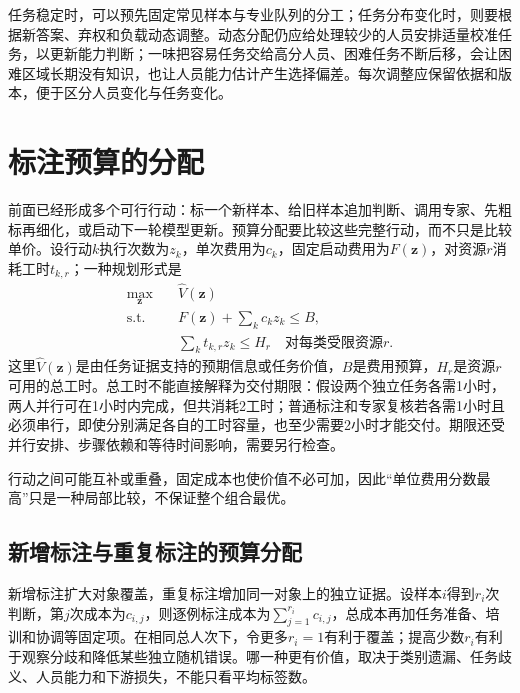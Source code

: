 任务稳定时，可以预先固定常见样本与专业队列的分工；任务分布变化时，则要根据新答案、弃权和负载动态调整。动态分配仍应给处理较少的人员安排适量校准任务，以更新能力判断；一味把容易任务交给高分人员、困难任务不断后移，会让困难区域长期没有知识，也让人员能力估计产生选择偏差。每次调整应保留依据和版本，便于区分人员变化与任务变化。

\section{标注预算的分配}
\label{sec:knowledge-acquisition-human-budget}

前面已经形成多个可行行动：标一个新样本、给旧样本追加判断、调用专家、先粗标再细化，或启动下一轮模型更新。预算分配要比较这些完整行动，而不只是比较单价。设行动$k$执行次数为$z_k$，单次费用为$c_k$，固定启动费用为$F(\bm{z})$，对资源$r$消耗工时$t_{k,r}$；一种规划形式是
\begin{equation}
  \begin{aligned}
    \max_{\bm{z}}\quad
      &\widehat V(\bm{z})\\
    \text{s.t.}\quad
      &F(\bm{z})+\sum_k c_k z_k\leq B,\\
      &\sum_k t_{k,r}z_k\leq H_r
      \quad\text{对每类受限资源$r$}.
  \end{aligned}
  \label{eq:knowledge-acquisition-human-budget-allocation}
\end{equation}
这里$\widehat V(\bm{z})$是由任务证据支持的预期信息或任务价值，$B$是费用预算，$H_r$是资源$r$可用的总工时。总工时不能直接解释为交付期限：假设两个独立任务各需1小时，两人并行可在1小时内完成，但共消耗2工时；普通标注和专家复核若各需1小时且必须串行，即使分别满足各自的工时容量，也至少需要2小时才能交付。期限还受并行安排、步骤依赖和等待时间影响，需要另行检查。

行动之间可能互补或重叠，固定成本也使价值不必可加，因此“单位费用分数最高”只是一种局部比较，不保证整个组合最优。

\subsection{新增标注与重复标注的预算分配}
\label{sec:knowledge-acquisition-human-new-versus-repeat}

新增标注扩大对象覆盖，重复标注增加同一对象上的独立证据。设样本$i$得到$r_i$次判断，第$j$次成本为$c_{i,j}$，则逐例标注成本为$\sum_{j=1}^{r_i}c_{i,j}$，总成本再加任务准备、培训和协调等固定项。在相同总人次下，令更多$r_i=1$有利于覆盖；提高少数$r_i$有利于观察分歧和降低某些独立随机错误。哪一种更有价值，取决于类别遗漏、任务歧义、人员能力和下游损失，不能只看平均标签数。


